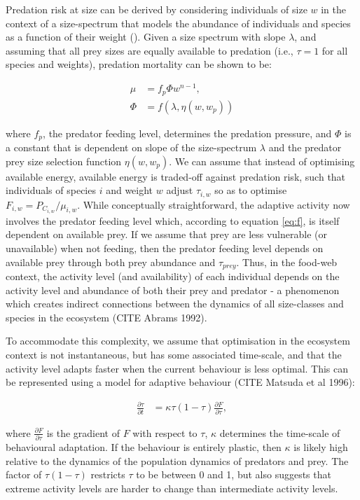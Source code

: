 \documentclass{article}\usepackage[]{graphicx}\usepackage[]{color}
\begin{document}
Predation risk at size can be derived by considering individuals of size $w$ in the context of a size-spectrum that models the abundance of individuals and species as a function of their weight (\cite{andersen_how_2009}). Given a size spectrum with slope $\lambda$, and assuming that all prey sizes are equally available to predation (i.e., $\tau = 1$ for all species and weights), predation mortality can be shown to be:

\begin{align}
\mu &= f_p \Phi w^{n-1},\\
\Phi &= f(\lambda,\eta(w,w_p))
\end{align}

where $f_p$, the predator feeding level, determines the predation pressure, and $\Phi$ is a constant that is dependent on slope of the size-spectrum $\lambda$ and the predator prey size selection function $\eta(w,w_p)$. We can assume that instead of optimising available energy, available energy is traded-off against predation risk, such that individuals of species $i$ and weight $w$ adjust $\tau_{i,w}$ so as to optimise $F_{i,w} = P_C_{i,w}/\mu_{i,w}$. While conceptually straightforward, the adaptive activity now involves the predator feeding level which, according to equation \ref{eq:f}, is itself dependent on available prey. If we assume that prey are less vulnerable (or unavailable) when not feeding, then the predator feeding level depends on available prey through both prey abundance and $\tau_{prey}$. Thus, in the food-web context, the activity level (and availability) of each individual depends on the activity level and abundance of both their prey and predator - a phenomenon which creates indirect connections between the dynamics of all size-classes and species in the ecosystem (CITE Abrams 1992). 

To accommodate this complexity, we assume that optimisation in the ecosystem context is not instantaneous, but has some associated time-scale, and that the activity level adapts faster when the current behaviour is less optimal. This can be represented using a model for adaptive behaviour (CITE Matsuda et al 1996):

\begin{align}
\frac{\partial \tau}{\partial t} &= \kappa \tau(1-\tau) \frac{\partial F}{\partial \tau},
\label{eq:dtau}
\end{align}

where $\frac{\partial F}{\partial \tau}$ is the gradient of $F$ with respect to $\tau$, $\kappa$ determines the time-scale of behavioural adaptation. If the behaviour is entirely plastic, then $\kappa$ is likely high relative to the dynamics of the population dynamics of predators and prey. The factor of $\tau(1-\tau)$ restricts $\tau$ to be between 0 and 1, but also suggests that extreme activity levels are harder to change than intermediate activity levels.
\end{document}
